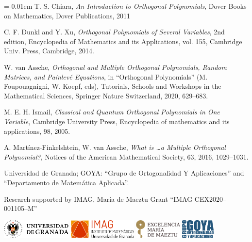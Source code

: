 \documentclass[portrait,final,a0paper,fontscale=0.38]{baposter}
\begin{document}
\begin{poster}
{\smaller

\renewcommand{\section}[2]{\vskip 0.05em}
\begin{thebibliography}{1}\itemsep=-0.01em
\setlength{\baselineskip}{0.4em}
{\sc T. S. Chiara},
{\em An Introduction to Orthogonal Polynomials},
{\rm Dover Books on Mathematics, Dover Publications}, 2011

{\sc C. F. Dunkl and Y. Xu},
{\em Orthogonal Polynomials of Several Variables},
{\rm 2nd edition, Encyclopedia of Mathematics and its Applications, vol. 155, Cambridge Univ. Press, Cambridge}, 2014.

{\sc W. van Assche},
{\em Orthogonal and Multiple Orthogonal Polynomials, Random Matrices, and Painlevé Equations}, in 
{\rm ``Orthogonal Polynomials'' (M. Foupouagnigni, W. Koepf, eds), Tutorials, Schools and Workshops in the Mathematical Sciences, Springer Nature Switzerland}, 2020, 629--683.

{\sc M. E. H. Ismail},
{\em Classical and Quantum Orthogonal Polynomials in One Variable},
{\rm Cambridge University Press, Encyclopedia of mathematics and its applications}, 98, 2005.

{\sc A. Martínez-Finkelshtein, W. van Assche},
{\em What is \dots a Multiple Orthogonal Polynomial?},
{\rm Notices of the American Mathematical Society}, 63, 2016, 1029--1031.

\end{thebibliography}



{\noindent\hspace*{-5pt}
 Universidad de Granada; GOYA: ``Grupo de Ortogonalidad Y Aplicaciones'' and ``Departamento de Matemática Aplicada''.}
\noindent \begin{flushleft}
  Research supported by IMAG, María de Maeztu Grant ``IMAG CEX2020--001105--M''
\end{flushleft} 
\vspace{1pt}
\centerline{
\includegraphics[height=0.98cm]{ugrH} \quad
\includegraphics[height=0.98cm]{IMAG} \quad
\includegraphics[height=0.98cm]{maeztu} \quad
\includegraphics[height=0.98cm]{goya.png}
}

}
\end{poster}
\end{document}
